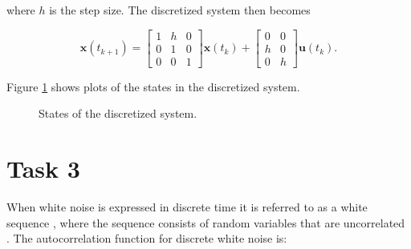 \documentclass{article}
\begin{document}
where $h$ is the step size. The discretized system then becomes

\begin{equation}
	\bm{x}(t_{k+1}) =
	\begin{bmatrix}
		1 & h & 0 \\
		0 & 1 & 0 \\
		0 & 0 & 1
	\end{bmatrix}
	\bm{x}(t_k) + 
	\begin{bmatrix}
		0 & 0 \\
		h & 0 \\
		0 & h
	\end{bmatrix}
	\bm{u}(t_k).
\end{equation}

Figure \ref{fig:disc_states} shows plots of the states in the discretized system.

\begin{figure}[!ht]
    \centering
    \caption{States of the discretized system.}
    \label{fig:disc_states}
\end{figure}


\section*{Task 3}
When white noise is expressed in discrete time it is referred to as a white sequence \cite{heftet}, where the sequence consists of random variables that are uncorrelated \cite{wikiWhite}. The autocorrelation function for discrete white noise is:
\end{document}
